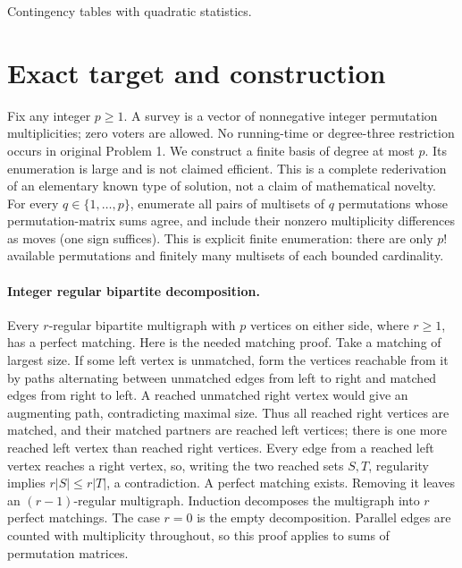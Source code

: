 \documentclass[11pt]{article}
\begin{document}
Contingency tables with quadratic statistics.

\section{Exact target and construction}
Fix any integer $p\ge1$. A survey is a vector of nonnegative integer
permutation multiplicities; zero voters are allowed. No running-time or
degree-three restriction occurs in original Problem 1. We construct a
finite basis of degree at most $p$. Its enumeration is large and is not
claimed efficient. This is a complete rederivation of an elementary known
type of solution, not a claim of mathematical novelty.
For every $q\in\{1,\ldots,p\}$, enumerate all pairs of multisets of $q$
permutations whose permutation-matrix sums agree, and include their
nonzero multiplicity differences as moves (one sign suffices). This is
explicit finite enumeration: there are only $p!$ available permutations
and finitely many multisets of each bounded cardinality.

\paragraph{Integer regular bipartite decomposition.}
Every $r$-regular bipartite multigraph with $p$ vertices on either side,
where $r\ge1$, has a perfect matching. Here is the needed matching proof.
Take a matching of largest size. If some left vertex is unmatched, form
the vertices reachable from it by paths alternating between unmatched
edges from left to right and matched edges from right to left. A reached
unmatched right vertex would give an augmenting path, contradicting
maximal size. Thus all reached right vertices are matched, and their
matched partners are reached left vertices; there is one more reached
left vertex than reached right vertices. Every edge from a reached left
vertex reaches a right vertex, so, writing the two reached sets $S,T$,
regularity implies $r|S|\le r|T|$, a contradiction. A perfect matching
exists. Removing it leaves an $(r-1)$-regular multigraph. Induction
decomposes the multigraph into $r$ perfect matchings. The case $r=0$
is the empty decomposition. Parallel edges are counted with multiplicity
throughout, so this proof applies to sums of permutation matrices.
\end{document}
